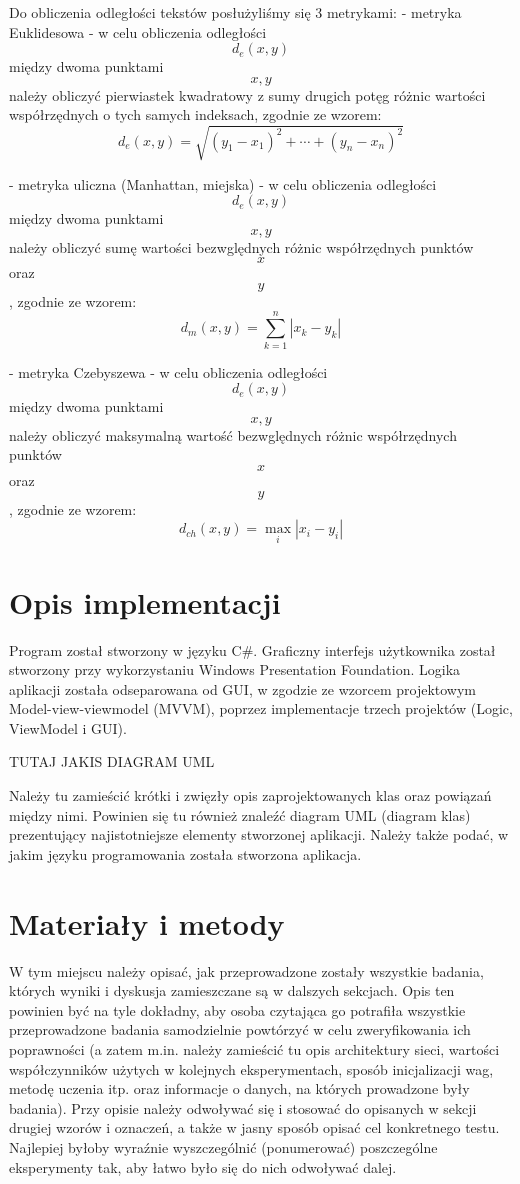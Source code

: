 \documentclass{classrep}
\begin{document}
		Do obliczenia odległości tekstów posłużyliśmy się 3 metrykami:
		- metryka Euklidesowa - w celu obliczenia odległości $$ d_{e}(x,y) $$ między dwoma punktami $$ x, y $$ należy obliczyć pierwiastek kwadratowy z sumy drugich potęg różnic wartości współrzędnych o tych samych indeksach, zgodnie ze wzorem:
			$$
			d_{e}(x,y)= \sqrt{ (y_{1} - x_{1})^2 + \cdots + (y_{n} - x_{n})^2 }
			$$
			
		- metryka uliczna (Manhattan, miejska) - w celu obliczenia odległości $$ d_{e}(x,y) $$ między dwoma punktami $$ x, y $$ należy obliczyć sumę wartości bezwględnych różnic współrzędnych punktów $$ x $$ oraz $$ y $$, zgodnie ze wzorem:
			$$
			d_{m}(x,y)= \sum_{k=1}^{n} | x_{k} - y_{k} |
			$$
			
		- metryka Czebyszewa - w celu obliczenia odległości $$ d_{e}(x,y) $$ między dwoma punktami $$ x, y $$ należy obliczyć maksymalną wartość bezwględnych różnic współrzędnych punktów $$ x $$ oraz $$ y $$, zgodnie ze wzorem:
			$$
			d_{ch}(x,y)= \max_{i} |x_{i} - y_{i}|
			$$

	\section{Opis implementacji}
	Program został stworzony w języku C\#. Graficzny interfejs użytkownika został stworzony przy  wykorzystaniu Windows Presentation Foundation. Logika aplikacji została odseparowana od GUI, w zgodzie ze wzorcem projektowym Model-view-viewmodel (MVVM), poprzez implementacje trzech projektów (Logic, ViewModel i GUI).
	
	\newline TUTAJ JAKIS DIAGRAM UML \newline
	
	
	{\color{blue}
		Należy tu zamieścić krótki i zwięzły opis zaprojektowanych klas oraz powiązań
		między nimi. Powinien się tu również znaleźć diagram UML  (diagram klas)
		prezentujący najistotniejsze elementy stworzonej aplikacji. Należy także
		podać, w jakim języku programowania została stworzona aplikacja. }
	
	\section{Materiały i metody}
	{\color{blue}
		W tym miejscu należy opisać, jak przeprowadzone zostały wszystkie badania,
		których wyniki i dyskusja zamieszczane są w dalszych sekcjach. Opis ten
		powinien być na tyle dokładny, aby osoba czytająca go potrafiła wszystkie
		przeprowadzone badania samodzielnie powtórzyć w celu zweryfikowania ich
		poprawności (a zatem m.in. należy zamieścić tu opis architektury sieci,
		wartości współczynników użytych w kolejnych eksperymentach, sposób
		inicjalizacji wag, metodę uczenia itp. oraz informacje o danych, na których
		prowadzone były badania). Przy opisie należy odwoływać się i stosować do
		opisanych w sekcji drugiej wzorów i oznaczeń, a także w jasny sposób opisać
		cel konkretnego testu. Najlepiej byłoby wyraźnie wyszczególnić (ponumerować)
		poszczególne eksperymenty tak, aby łatwo było się do nich odwoływać dalej.}
	
\end{document}
